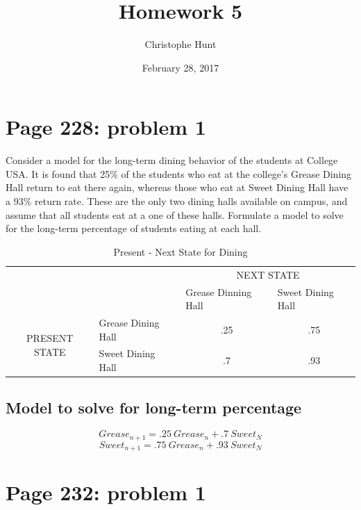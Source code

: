 \documentclass[]{article}
\title{Homework 5}
\author{Christophe Hunt}
\date{February 28, 2017}
\begin{document}
\maketitle

{
\setcounter{tocdepth}{2}
\tableofcontents
}
\newpage

\section{Page 228: problem 1}\label{page-228-problem-1}

Consider a model for the long-term dining behavior of the students at
College USA. It is found that 25\% of the students who eat at the
college's Grease Dining Hall return to eat there again, whereas those
who eat at Sweet Dining Hall have a 93\% return rate. These are the only
two dining halls available on campus, and assume that all students eat
at a one of these halls. Formulate a model to solve for the long-term
percentage of students eating at each hall.

\begin{table}[h]
\centering
\caption{Present - Next State for Dining}
\label{Present - Next State for Dining}
\begin{tabular}{cl|cc|}
\cline{3-4}
 &  & \multicolumn{2}{c|}{NEXT STATE} \\ \cline{3-4} 
\multicolumn{1}{l}{} &  & \multicolumn{1}{l}{Grease Dinning Hall} & \multicolumn{1}{l|}{Sweet Dining Hall} \\ \hline
\multicolumn{1}{|c|}{\multirow{2}{*}{PRESENT STATE}} & Grease Dining Hall & .25 & .75 \\
\multicolumn{1}{|c|}{} & Sweet Dining Hall & .7 & .93 \\ \hline
\end{tabular}
\end{table}

\subsection{Model to solve for long-term
percentage}\label{model-to-solve-for-long-term-percentage}

\[Grease_{n+1} = .25~Grease_n + .7~Sweet_N\]
\[Sweet_{n+1} = .75~Grease_n + .93~Sweet_N\]

\newpage

\section{Page 232: problem 1}\label{page-232-problem-1}
\end{document}
